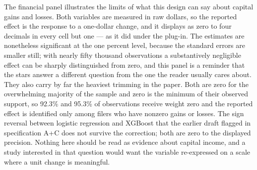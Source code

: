 \documentclass[12pt]{article}
\begin{document}
	The financial panel illustrates the limits of what this design can say about capital gains and losses. Both variables are measured in raw dollars, so the reported effect is the response to a one-dollar change, and it displays as zero to four decimals in every cell but one --- as it did under the plug-in. The estimates are nonetheless significant at the one percent level, because the standard errors are smaller still; with nearly fifty thousand observations a substantively negligible effect can be sharply distinguished from zero, and this panel is a reminder that the stars answer a different question from the one the reader usually cares about. They also carry by far the heaviest trimming in the paper. Both are zero for the overwhelming majority of the sample and zero is the minimum of their observed support, so 92.3\% and 95.3\% of observations receive weight zero and the reported effect is identified only among filers who have nonzero gains or losses. The sign reversal between logistic regression and XGBoost that the earlier draft flagged in specification A+C does not survive the correction; both are zero to the displayed precision. Nothing here should be read as evidence about capital income, and a study interested in that question would want the variable re-expressed on a scale where a unit change is meaningful.
	
\end{document}
